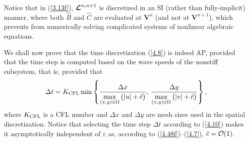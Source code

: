 \documentclass[A4paper,12pt,twoside]{article}
\numberwithin{equation}{section}
\numberwithin{figure}{section}
\numberwithin{table}{section}
\newcommand{\dt}{\Delta t}
\newcommand{\dx}{\Delta x}
\newcommand{\dy}{\Delta y}
\newcommand{\ve}{\varepsilon}
\newcommand\eref[1]{(\ref{#1})}
\newcommand{\lore}[1]{{\leavevmode\color{red} #1}}
\begin{document}
Notice that in \eref{3.13f}, $\bm{{\cal L}}^{n,n+1}$ is discretized in an SI (rather than \lore{fully-}implicit) manner, where both $\widehat B$ and
$\widehat C$ are evaluated at $\bm V^n$ (and not at $\bm V^{n+1}$), which 
\lore{prevents from} numerically solving complicated
systems of nonlinear algebraic equations.

We shall now prove that the time discretization \eref{4.8} is indeed AP, provided that the time step is computed based on the wave speeds of
the nonstiff subsystem, that is, provided that
\begin{equation}
\dt=K_{\rm CFL}\min\left\{\frac{\dx}{\max\limits_{(x,y)\in\Omega}\big(|u|+\tilde c\big)},\,
\frac{\dy}{\max\limits_{(x,y)\in\Omega}\big(|v|+\tilde c\big)}\right\},
\label{4.10}
\end{equation}
where $K_{\rm CFL}$ is a CFL number and $\dx$ and $\dy$ are mesh sizes used in the spatial discretization. Notice that selecting the time
step $\dt$ according to \eref{4.10} makes it \lore{asymptotically} independent of $\ve$ as, according to \eref{4.48f}--\eref{4.7}, $\tilde c={\cal O}(1)$.
\end{document}

